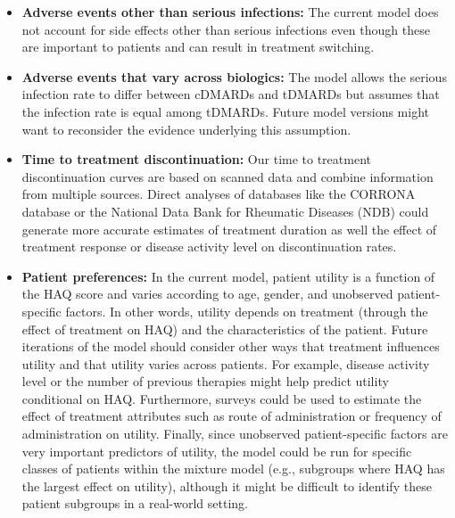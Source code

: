 \documentclass[11pt,final,fleqn]{article}\usepackage[]{graphicx}\usepackage[]{color}
\theoremstyle{plain}
\begin{document}
\begin{itemize}
\item \textbf{Adverse events other than serious infections:} The current model does not account for side effects other than serious infections even though these are important to patients and can result in treatment switching. 
\item \textbf{Adverse events that vary across biologics:} The model allows the serious infection rate to differ between cDMARDs and tDMARDs but assumes that the infection rate is equal among tDMARDs. Future model versions might want to reconsider the evidence underlying this assumption.
\item \textbf{Time to treatment discontinuation:} Our time to treatment discontinuation curves are based on scanned data and combine information from multiple sources. Direct analyses of databases like the CORRONA database or the National Data Bank for Rheumatic Diseases (NDB) could generate more accurate estimates of treatment duration as well the effect of treatment response or disease activity level on discontinuation rates.  
\item \textbf{Patient preferences:} In the current model, patient utility is a function of the HAQ score and varies according to age, gender, and unobserved patient-specific factors. In other words, utility depends on treatment (through the effect of treatment on HAQ) and the characteristics of the patient. Future iterations of the model should consider other ways that treatment influences utility and that utility varies across patients. For example, disease activity level or the number of previous therapies might help predict utility conditional on HAQ. Furthermore, surveys could be used to estimate the effect of treatment attributes such as route of administration or frequency of administration on utility. Finally, since unobserved patient-specific factors are very important predictors of utility, the model could be run for specific classes of patients within the mixture model (e.g., subgroups where HAQ has the largest effect on utility), although it might be difficult to identify these patient subgroups in a real-world setting. 


\end{itemize}
\end{document}
